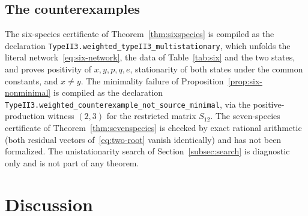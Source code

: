 \documentclass[11pt,reqno]{amsart}
\theoremstyle{plain}
\theoremstyle{definition}
\theoremstyle{remark}
\numberwithin{equation}{section}
\begin{document}
\subsection{The counterexamples}
The six-species certificate of Theorem~\ref{thm:sixspecies} is compiled as the declaration \texttt{TypeII3.weighted\_\allowbreak typeII3\_\allowbreak multistationary}, which unfolds the literal network~\eqref{eq:six-network}, the data of Table~\ref{tab:six} and the two states, and proves positivity of $x,y,p,q,e$, stationarity of both states under the common constants, and $x\ne y$.  The minimality failure of Proposition~\ref{prop:six-nonminimal} is compiled as the declaration \texttt{TypeII3.weighted\_\allowbreak counterexample\_\allowbreak not\_\allowbreak source\_\allowbreak minimal}, via the positive-production witness $(2,3)$ for the restricted matrix $S_{12}$.  The seven-species certificate of Theorem~\ref{thm:sevenspecies} is checked by exact rational arithmetic (both residual vectors of~\eqref{eq:two-root} vanish identically) and has not been formalized.  The unistationarity search of Section~\ref{subsec:search} is diagnostic only and is not part of any theorem.

\section{Discussion}\label{sec:discussion}
\end{document}
